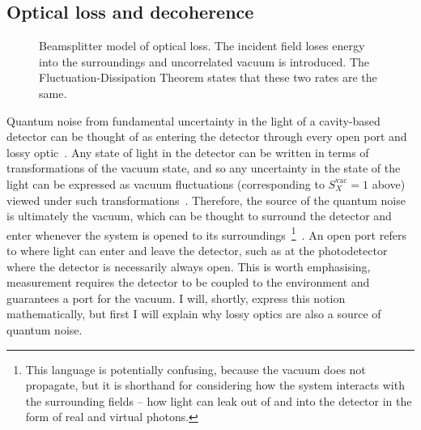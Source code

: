 
\subsection{Optical loss and decoherence}
\label{sec:optical_loss_background}

\begin{figure}
	\centering
	\caption{Beamsplitter model of optical loss. The incident field loses energy into the surroundings and uncorrelated vacuum is introduced. The Fluctuation-Dissipation Theorem states that these two rates are the same.}
	\label{fig:beamsplitter_loss}
\end{figure}

Quantum noise from fundamental uncertainty in the light of a cavity-based detector can be thought of as entering the detector through every open port and lossy optic~\cite{}. %
Any state of light in the detector can be written in terms of transformations of the vacuum state, and so any uncertainty in the state of the light can be expressed as vacuum fluctuations (corresponding to $S_X^\text{vac}=1$ above) viewed under such transformations~\cite{}. Therefore, the source of the quantum noise is ultimately the vacuum, which can be thought to surround the detector and enter whenever the system is opened to its surroundings~\footnote{This language is potentially confusing, because the vacuum does not propagate, but it is shorthand for considering how the system interacts with the surrounding fields -- how light can leak out of and into the detector in the form of real and virtual photons.}~\cite{}. An open port refers to where light can enter and leave the detector, such as at the photodetector where the detector is necessarily always open. This is worth emphasising, measurement requires the detector to be coupled to the environment and guarantees a port for the vacuum. %
I will, shortly, express this notion mathematically, but first I will explain why lossy optics are also a source of quantum noise.


